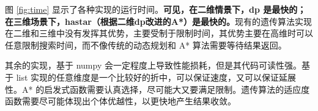     图 \ref{fig:time} 显示了各种实现的运行时间。\textbf{可见，在二维情景下，dp 是最快的；在三维场景下，hastar（根据二维dp改进的A*）是最快的。}现有的遗传算法实现在二维和三维中没有发挥其优势，主要受制于限制时间，其优势主要在高维时可以任意限制搜索时间，而不像传统的动态规划和 A* 算法需要等待结果返回。
    
    其余的实现，基于 numpy 会一定程度上导致性能损耗，但是其代码可读性强。基于 list 实现的任意维度是一个比较好的折中，可以保证速度，又可以保证延展性。A* 的启发式函数需要认真选择，尽可能大又要满足限制。遗传算法的适应度函数需要尽可能体现出个体优越性，以更快地产生结果收敛。

    

